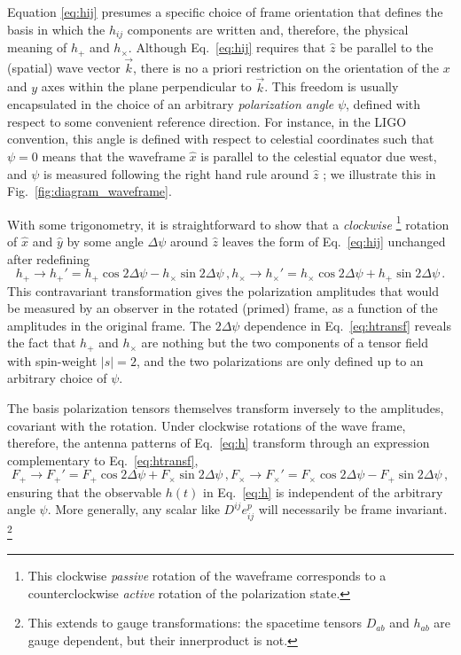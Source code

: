 \documentclass[aps,prd,twocolumn,superscriptaddress,preprintnumbers,floatfix,nofootinbib]{revtex4-2}
\newcommand{\beq}{\begin{equation}}
\newcommand{\eeq}{\end{equation}}
\newcommand*{\eq}[1]{Eq.~\eqref{eq:#1}}
\begin{document}
Equation \eqref{eq:hij} presumes a specific choice of frame orientation that defines the basis in which the $h_{ij}$ components are written and, therefore, the physical meaning of $h_{+}$ and $h_\times$.
Although \eq{hij} requires that $\hat{z}$ be parallel to the (spatial) wave vector $\vec{k}$, there is no a priori restriction on the orientation of the $x$ and $y$ axes within the plane perpendicular to $\vec{k}$.
This freedom is usually encapsulated in the choice of an arbitrary \emph{polarization angle} $\psi$, defined with respect to some convenient reference direction.
For instance, in the LIGO convention, this angle is defined with respect to celestial coordinates such that $\psi=0$ means that the waveframe $\hat{x}$ is parallel to the celestial equator due west, and $\psi$ is measured following the right hand rule around $\hat{z}$ \cite{LALSuite:wave}; we illustrate this in Fig.~\ref{fig:diagram_waveframe}.

With some trigonometry, it is straightforward to show that a \emph{clockwise}%
\footnote{This clockwise \emph{passive} rotation of the waveframe corresponds to a counterclockwise \emph{active} rotation of the polarization state.}
rotation of $\hat{x}$ and $\hat{y}$ by some angle $\Delta \psi$ around $\hat{z}$ leaves the form of \eq{hij} unchanged after redefining
\begin{subequations} \label{eq:htransf}
\beq
h_+ \rightarrow h_+' = h_+ \cos 2\Delta \psi - h_\times \sin 2\Delta\psi \, ,
\eeq
\beq
h_\times \rightarrow h_\times' = h_\times \cos 2\Delta \psi + h_+ \sin 2\Delta\psi \, .
\eeq
\end{subequations}
This contravariant transformation gives the polarization amplitudes that would be measured by an observer in the rotated (primed) frame, as a function of the amplitudes in the original frame.
The $2\Delta\psi$ dependence in \eq{htransf} reveals the fact that $h_+$ and $h_\times$ are nothing but the two components of a tensor field with spin-weight $|s|=2$, and the two polarizations are only defined up to an arbitrary choice of $\psi$.

The basis polarization tensors themselves transform inversely to the amplitudes, covariant with the rotation.
Under clockwise rotations of the wave frame, therefore, the antenna patterns of \eq{h} transform through an expression complementary to \eq{htransf},
\begin{subequations} \label{eq:Ftransf}
\beq
F_+ \rightarrow F_+' = F_+ \cos 2\Delta \psi + F_\times \sin 2\Delta\psi \, ,
\eeq
\beq
F_\times \rightarrow F_\times' = F_\times \cos 2\Delta \psi - F_+ \sin 2\Delta\psi \, ,
\eeq
\end{subequations}
ensuring that the observable $h(t)$ in \eq{h} is independent of the arbitrary angle $\psi$.
More generally, any scalar like $D^{ij} e^{p}_{ij}$ will necessarily be frame invariant.%
\footnote{This extends to gauge transformations: the spacetime tensors $D_{ab}$ and $h_{ab}$ are gauge dependent, but their innerproduct is not.}
\end{document}
